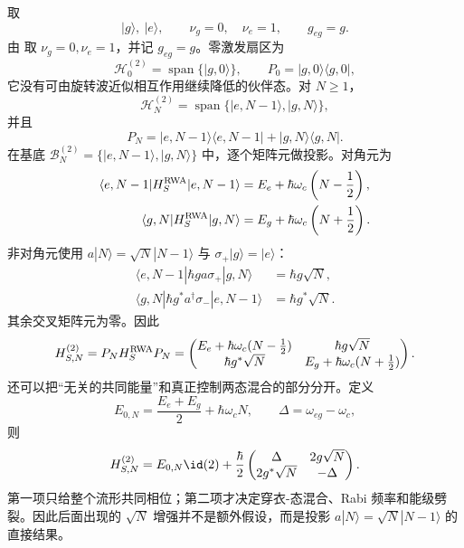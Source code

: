 取
\[
|g\rangle,\ |e\rangle,
\qquad
\nu_g=0,\quad \nu_e=1,
\qquad
g_{eg}=g.
\]
由 取 $\nu_g=0,\nu_e=1$，并记 $g_{eg}=g$。零激发扇区为
\[
\mathcal H_0^{(2)}=\operatorname{span}\{|g,0\rangle\},
\qquad
P_0=|g,0\rangle\langle g,0|,
\]
它没有可由旋转波近似相互作用继续降低的伙伴态。对 $N\ge1$，
\[
\mathcal H_N^{(2)}
=\operatorname{span}\{|e,N-1\rangle,|g,N\rangle\},
\]
并且
\begin{equation}
P_N=|e,N-1\rangle\langle e,N-1|
+|g,N\rangle\langle g,N|.
\label{eq:phys-oqs-pn-two}
\end{equation}
在基底 $\mathcal B_N^{(2)}=\{|e,N-1\rangle,|g,N\rangle\}$ 中，逐个矩阵元做投影。对角元为
\[
\begin{aligned}
\langle e,N-1|H_S^{\rm RWA}|e,N-1\rangle
&=E_e+\hbar\omega_c\left(N-\frac12\right),\\
\langle g,N|H_S^{\rm RWA}|g,N\rangle
&=E_g+\hbar\omega_c\left(N+\frac12\right).
\end{aligned}
\]
非对角元使用 $a|N\rangle=\sqrt N|N-1\rangle$ 与 $\sigma_+|g\rangle=|e\rangle$：
\[
\begin{aligned}
\langle e,N-1|\hbar g a\sigma_+|g,N\rangle
&=\hbar g\sqrt N,\\
\langle g,N|\hbar g^*a^\dagger\sigma_-|e,N-1\rangle
&=\hbar g^*\sqrt N.
\end{aligned}
\]
其余交叉矩阵元为零。因此
\begin{equation}
H_{S,N}^{(2)}
=P_NH_S^{\rm RWA}P_N
=\begin{pmatrix}
E_e+\hbar\omega_c(N-\frac12)&\hbar g\sqrt N\\
\hbar g^*\sqrt N&E_g+\hbar\omega_c(N+\frac12)
\end{pmatrix}.
\label{eq:phys-oqs-hn2-bare}
\end{equation}
 还可以把“无关的共同能量”和真正控制两态混合的部分分开。定义
\begin{equation}
E_{0,N}=\frac{E_e+E_g}{2}+\hbar\omega_cN,
\qquad
\Delta=\omega_{eg}-\omega_c,
\label{eq:phys-oqs-two-detuning}
\end{equation}
则
\begin{equation}
H_{S,N}^{(2)}
=E_{0,N}\id(2)
+\frac{\hbar}{2}
\begin{pmatrix}
\Delta&2g\sqrt N\\
2g^*\sqrt N&-\Delta
\end{pmatrix}.
\label{eq:phys-oqs-hn2-detuning-form}
\end{equation}
第一项只给整个流形共同相位；第二项才决定穿衣-态混合、Rabi 频率和能级劈裂。因此后面出现的 $\sqrt N$ 增强并不是额外假设，而是投影 $a|N\rangle=\sqrt N|N-1\rangle$ 的直接结果。

